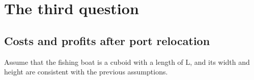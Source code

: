 \documentclass{mcmthesis}
\begin{document}
\begin{figure}[htbp]
  
    \centering
    \caption{}
  \end{figure}
 
\section{The third question}
\subsection{Costs and profits after port relocation}

Assume that the fishing boat is a cuboid with a length of L, and its width and height are consistent with the previous assumptions.
\end{document}
